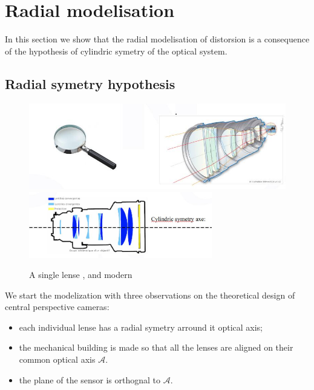 
\section{Radial modelisation}

\label{RadMod}

In this section we  show that the radial modelisation of distorsion is a consequence
of the hypothesis of cylindric symetry of the optical system.


\subsection{Radial symetry hypothesis}

\begin{figure}
\centering
	\includegraphics[width=12cm]{Methods/Images/Lenses.jpg} \\
	\includegraphics[width=8cm]{Methods/Images/LensesCyl.jpg}
	\caption{A single lense , and modern }
	\label{fig:Lenses}
\end{figure}

We start the modelization with three observations on the theoretical design of central perspective cameras:

\begin{itemize}
    \item  each individual lense has a radial symetry arround it optical axis;
    \item  the mechanical building is made so that all the lenses are aligned on
	    their common optical axis $\mathcal{A}$.
    \item  the plane of the sensor is orthognal to $\mathcal{A}$.
\end{itemize}

